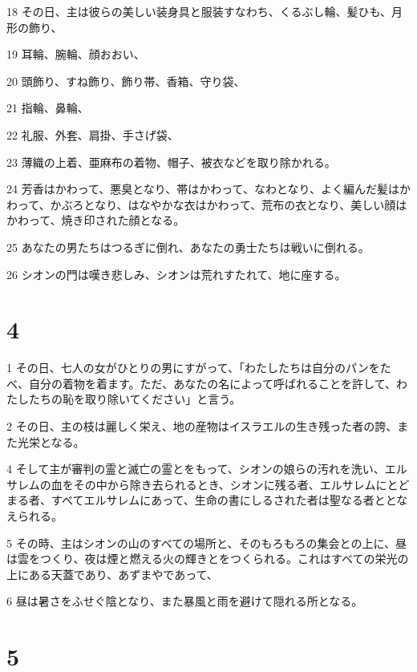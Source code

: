 \par 18 その日、主は彼らの美しい装身具と服装すなわち、くるぶし輪、髪ひも、月形の飾り、
\par 19 耳輪、腕輪、顔おおい、
\par 20 頭飾り、すね飾り、飾り帯、香箱、守り袋、
\par 21 指輪、鼻輪、
\par 22 礼服、外套、肩掛、手さげ袋、
\par 23 薄織の上着、亜麻布の着物、帽子、被衣などを取り除かれる。
\par 24 芳香はかわって、悪臭となり、帯はかわって、なわとなり、よく編んだ髪はかわって、かぶろとなり、はなやかな衣はかわって、荒布の衣となり、美しい顔はかわって、焼き印された顔となる。
\par 25 あなたの男たちはつるぎに倒れ、あなたの勇士たちは戦いに倒れる。
\par 26 シオンの門は嘆き悲しみ、シオンは荒れすたれて、地に座する。

\chapter{4}

\par 1 その日、七人の女がひとりの男にすがって、「わたしたちは自分のパンをたべ、自分の着物を着ます。ただ、あなたの名によって呼ばれることを許して、わたしたちの恥を取り除いてください」と言う。
\par 2 その日、主の枝は麗しく栄え、地の産物はイスラエルの生き残った者の誇、また光栄となる。
\par 4 そして主が審判の霊と滅亡の霊とをもって、シオンの娘らの汚れを洗い、エルサレムの血をその中から除き去られるとき、シオンに残る者、エルサレムにとどまる者、すべてエルサレムにあって、生命の書にしるされた者は聖なる者ととなえられる。
\par 5 その時、主はシオンの山のすべての場所と、そのもろもろの集会との上に、昼は雲をつくり、夜は煙と燃える火の輝きとをつくられる。これはすべての栄光の上にある天蓋であり、あずまやであって、
\par 6 昼は暑さをふせぐ陰となり、また暴風と雨を避けて隠れる所となる。

\chapter{5}

